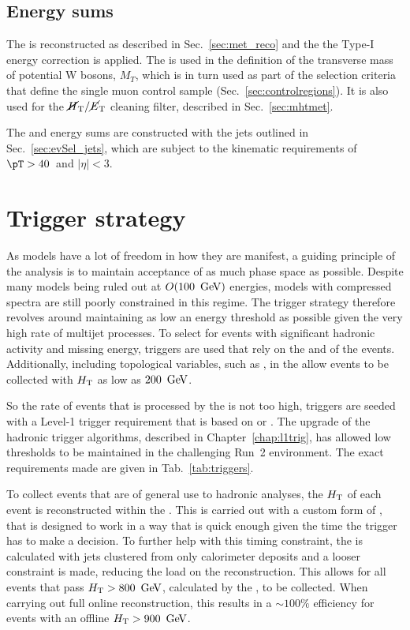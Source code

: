 \subsection{Energy sums}

The \MET is reconstructed as described in
Sec.~\ref{sec:met_reco} and the the Type-I \MET energy correction is applied.
The \met is used in the definition of 
the transverse mass of potential W bosons, $M_{T}$, which is in turn used as part of
the selection criteria that define the single muon control sample 
(Sec.~\ref{sec:controlregions}). It is also used for the $\mbox{$\mbox{$\cancel{H}_\text{T}$} / \mbox{$\cancel{E}_\text{T}$}$}$ cleaning
filter, described in Sec.~\ref{sec:mhtmet}.

The \HT and \MHT energy sums are constructed with the jets outlined in
Sec.~\ref{sec:evSel_jets}, which are subject to the kinematic requirements of
$\pT>40$~\gev and $|\eta|<3$.

\section{Trigger strategy}
\label{sec:trigStrat}

As \SUSY models have a lot of freedom in how they are manifest, a
guiding principle of the analysis is to maintain acceptance of as much
phase space as possible. Despite many \SUSY models being ruled out at
$O(100~\mathrm{\,Ge\kern -0.1em V})$ energies, models with compressed spectra are still poorly
constrained in this regime. The trigger strategy therefore revolves
around maintaining as low an energy threshold as possible given the
very high rate of \QCD multijet processes. To select for events with
significant hadronic activity and missing energy, triggers are used
that rely on the \HT and \MHT of the events. Additionally, including
topological variables, such as \alphat, in the \HLT allow events to be
collected with $\mbox{$H_\text{T}$}$ as low as $200~\mathrm{\,Ge\kern -0.1em V}$. 

So the rate of events that is processed by the \HLT is not too high,
\HLT triggers are seeded with a Level-1 trigger requirement that is
based on \HT or \MET. The upgrade of the hadronic trigger algorithms,
described in Chapter~\ref{chap:l1trig}, has allowed low thresholds to
be maintained in the challenging Run~2 environment. The exact
requirements made are given in Tab.~\ref{tab:triggers}.

To collect events that are of general use to hadronic analyses, the
$\mbox{$H_\text{T}$}$ of each event is reconstructed within the \HLT. This is carried
out with a custom form of \PF, that is designed to work in a way that
is quick enough given the time the trigger has to make a decision. To
further help with this timing constraint, the \HT is calculated with
jets clustered from only calorimeter deposits and a looser constraint
is made, reducing the load on the \PF reconstruction. This allows for
all events that pass $\mbox{$H_\text{T}$}>800~\mathrm{\,Ge\kern -0.1em V}$, calculated by the \HLT,
to be collected. When carrying out full online reconstruction, this
results in a $\sim 100\%$ efficiency for events with an offline
$\mbox{$H_\text{T}$}>900~\mathrm{\,Ge\kern -0.1em V}$. 

